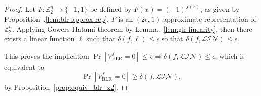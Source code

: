\begin{proof}
    Let $F: \mathbb{Z}_2^n \to \{-1,1\}$ be defined by $F(x)=(-1)^{f(x)}$, as given by Proposition~.\ref{lem:blr-approx-rep}.
    $F$ is an $(2\epsilon,1)$ approximate representation of $\mathbb{Z}_2^n$.
    Applying Gowers-Hatami theorem by Lemma.~\ref{lem:gh-linearity},
    then there exists a linear function $\ell$ such that $\delta(f, \ell) \leq \epsilon$ so that $\delta(f,\mathcal{LIN})\le \epsilon$.

    This proves the implication 
    $\Pr[V_{\text{BLR}}^f=0]\le \epsilon \Rightarrow \delta(f,\mathcal{LIN})\le \epsilon$,
    which is equivalent to
    \[
        \Pr[V_{\text{BLR}}^f=0]\ge \delta(f,\mathcal{LIN}),
    \]
     by Proposition~\ref{prop:equiv_blr_z2}.
\end{proof}